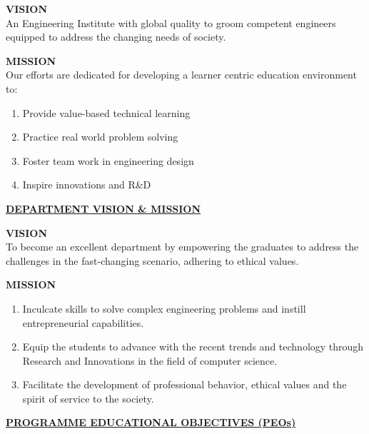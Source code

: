 \documentclass[a4paper,12pt]{report}
\begin{document}
\noindent \textbf{VISION} \\[0.2cm]
An Engineering Institute with global quality to groom competent engineers equipped to address the changing needs of society.
\vspace{0.5cm}

\noindent \textbf{MISSION} \\[0.2cm]
Our efforts are dedicated for developing a learner centric education environment to:
\begin{enumerate}
    \item Provide value-based technical learning
    \item Practice real world problem solving
    \item Foster team work in engineering design
    \item Inspire innovations and R\&D
\end{enumerate}
\vspace{1cm}

\begin{center}
    \textbf{\underline{DEPARTMENT VISION \& MISSION}}
\end{center}
\vspace{0.5cm}

\noindent \textbf{VISION} \\[0.2cm]
To become an excellent department by empowering the graduates to address the challenges in the fast-changing scenario, adhering to ethical values.
\vspace{0.5cm}

\noindent \textbf{MISSION} \\[0.2cm]
\begin{enumerate}
    \item Inculcate skills to solve complex engineering problems and instill entrepreneurial capabilities.
    \item Equip the students to advance with the recent trends and technology through Research and Innovations in the field of computer science.
    \item Facilitate the development of professional behavior, ethical values and the spirit of service to the society.
\end{enumerate}


\newpage
\begin{center}
    \textbf{\underline{PROGRAMME EDUCATIONAL OBJECTIVES (PEOs)}}
\end{center}
\vspace{0.5cm}
\end{document}
